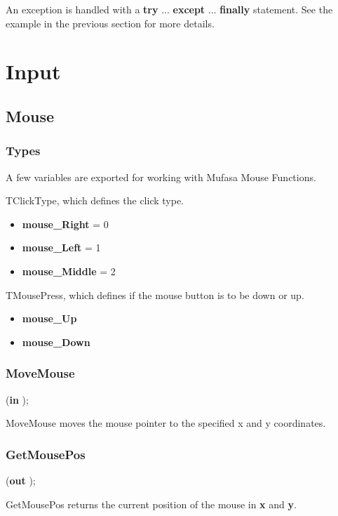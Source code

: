 \documentclass[a4paper]{report}
\begin{document}
An exception is handled with a \textbf{try} ... \textbf{except}
... \textbf{finally} statement.
See the example in the previous section for more details.

\chapter{Input}

\section{Mouse}

\subsection{Types}

A few variables are exported for working with Mufasa Mouse Functions.

TClickType, which defines the click type.
\begin{itemize}
	\item \textbf{mouse\_Right} = 0
	\item \textbf{mouse\_Left} = 1
	\item \textbf{mouse\_Middle} = 2
\end{itemize}

TMousePress, which defines if the mouse button is to be down or up.
\begin{itemize}
	\item \textbf{mouse\_Up}
	\item \textbf{mouse\_Down}
\end{itemize}


\subsection{MoveMouse}
\pproc {}(\textbf{in }  );

MoveMouse moves the mouse pointer to the specified x and y coordinates.

\subsection{GetMousePos}
\pproc {}(\textbf{out }  );

GetMousePos returns the current position of the mouse in \textbf{x} and
\textbf{y}.
\end{document}
